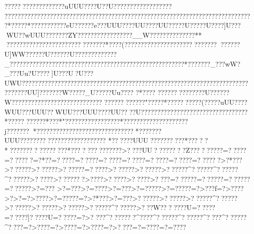 {{{{{{{{{{{{{{{{{{{{{{{{{{{{{{{{{{{{{{{{{{{{{{{{{{{{{{{{{{{{{{{{{{{{{{{{{{{{{{{{{{{{{{{{{{{{{{{{{{{{{{{{{{{{{{{{{{{{{{{{{{{{{{{{{{{{{{{{{{{{{{{{{{{{{{{{{{{{{{{{{{{{{{{{{{{{{{{{{{{{{{{{{{{{{{{{{{{{{{{{{{{{{{{{{{{{{{{{{{{{{{{{{{{{{{{{{{{{{{{{{{{{{{{{{{{{{{{{{{{{{{{{{{{{{{{{{{{{{{{{{{{{{{{{{{{{{{{{{{{{{{{{{{{{{{{{{{{{{{{{{{{{{{{{{{{{{{{{{{{{{{{{{{{{{{{{{{{{{{{{{{{{{{{{{{{{{{{{{{{{{{{{{{{{{{{{{{{{{{{{{{{{{{{{{{{{{{{{{{{{{{{{{{{{{{{{{{{{{{{{{{{{{{{{{{{{{{{{{{{{{{{{{{{{{{{{{{{{{{{{{{{{{{{{{{{{{{{{{{{{{{{{{{{{{{{{{{{{{{{{{{{{{{{{{{{{{{{{{{{{{{{{{{{{{{{{{{{{{{{{{{{{{{{{{{{{{{{{{{{{{{{{{{{{{{{{{{{{{{{{{{{{{{{{{{{{{{{{{{{{{{{{{{{{{{{{{{{{{{{{{{{{{{{{{{{{{{{{{{{{{{{{{{{{{{{{{{{{{{{{{{{{{{{{{{{{{{{{{{{{{{{{{{{{{{{{{{{{{{{{{{{{{{{{{{{{{{{{{{{{{{{{{{{{{{{{{{{{{{{{{{{{{{{{{{{{{{{{{{{{{{{{{{{{{{{{{{{{{{{{{{{{{{{{{{{{{{{{{{{{{{{{{{{{{{{{{{{{{{{{{{{{{{{{{{{{{{{{{{{{{{{{{{{{{{{{{{{{{{{{{{{{{{{{{{{{{{{{{{{{{{{{{{{{{{{{{{{{{{{{{{{{{{{{{{{{{{{{{{{{{{{{{{{{{{{{{{{{{{{{{{{{{{{{{{{{{{{{{{{{{{{{{{{{{{{{{{{{{{{{{{{{{{{{{{{{{{{{{{{{{{{{{{{{{{{{{{{{{{{{{{{{{{{{{{{{{{{{{{{{{{{{{{{{{{{{{{{{{{{{{{{{{{{{{{{{{{{{{{{{{{{{{{{{{{{{{{{{{{{{{{{{{{{{{{{{{{{{{{{{{{{{{{{{{{{{{{{{{{{{{{{{{{{{{{{{{{{{{{{{{{{{{{{{{{{{{{{{{{{{{{{{{{{{{{{{{{{{{{{{{{{{{{{{{{{{{{{{{{{{{{{{{{{{{{{{{{{{{{{{{{{{{{{{{{{{{{{{{{{{{{{{{{{{{{{{{{{{{{{{{{{{{{{{{{{{{{{{{{{{{{{{{{{{{{{{{{{{{{{{{{{{{{{{{{{{{{{{{{{{{{{{{{{{{{{{{{{{{{{{{{{{{{{{{{{{{{{{{{{{{{{{{{{{{{{{{{{{{{{{{{{{{{{{{{{{{{{{{{{{{{{{{{{{{{{{{{{{{{{{{{{{{{{{{{{{{{{{{{{{{{{{{{{{{{{{{{{{{{{{{{{{{{{{{{{{{{{{{{{{{{{{{{{{{{{{{{{{{{{{{{{{{{{{{{{{{{{{{{{{{{{{{{{{{{{{{{{{{{{{{{{{{{{{{{{{{{{{{{{{{{{{{{{{{{{{{{{{{{{{{{{{{{{{{{{{{{{{{{{{{{{{{{{{{{{{{{{{{{{{{{{{{{{{{{{{{{{{{{{{{{{{{{{{{{{{{{{{{{{{{{{{{{{{{{{{{{{{{{{{{{{{{{{{{{{{{{{{{{{{{{{{{{{{{{{{{{{{{{{{{{{{{{{{{{{{{{{{{{{{{{{{{{{{{{{{{{{{????? ?????????????uUUU????U??U??????????????????
?????????????????????????????????????????????????????????????????????????????*????? *????  ???????eU??????e???UUU????UU????UU?????U?????U????]U???WU??wUUU??    ?????ZY?????????????????__W???   ???????????**
??????????????????????????????*????(??????????????????????????????????U]WW??????U??????U?????????????_?????????? ????????????????????????????????????????????*???????_???wW?_???Uu?U????]U???U?U???U}WU?????????????????????????????????????????????????????????????????????????????UU]???????W?????_U?????Uu????
?*????
?????? ????????U??????W????????????????????????????
???????????? "????? *????? ?????  (?????uUU????WUU???UUU??WUU???UUU????UU????U?????????????????????????????????*?????
????? ?*???  *"?????????????????*????????????????????j??????? *????????????? ?????????????????*???????UUU??????????????????????????
*??????UUU??????????*????? 
*????????????????*??????????????>????UU????????Z?????????=?????=??????=?*??=?????=?????=?????=?????=?????=?????=??????>?*???>??????>??????>??????=?????>??????>??????>??????^??????^??????^??????>?????>???????>????>?????>?????>??  ??=??????=??????=??????=??????>?=???
>?=???>?=????>?=???>?=?????>?=?????=?>???f=?>????>?>?    =?>????>?=?????=?>?*???>?=???>??????>??????>??????^??????>??????>??????>??????>??????^??????>???W???????U=?????=?????]?????U=?????=?>?
???^???????^????^??????^??????^????^??????^????=?>????=?>????=?>????=?>????=?=????=?=????}}}}}}}}}}}}}}}}}}}}}}}}}}}}}}}}}}}}}}}}}}}}}}}}}}}}}}}}}}}}}}}}}}}}}}}}}}}}}}}}}}}}}}}}}}}}}}}}}}}}}}}}}}}}}}}}}}}}}}}}}}}}}}}}}}}}}}}}}}}}}}}}}}}}}}}}}}}}}}}}}}}}}}}}}}}}}}}}}}}}}}}}}}}}}}}}}}}}}}}}}}}}}}}}}}}}}}}}}}}}}}}}}}}}}}}}}}}}}}}}}}}}}}}}}}}}}}}}}}}}}}}}}}}}}}}}}}}}}}}}}}}}}}}}}}}}}}}}}}}}}}}}}}}}}}}}}}}}}}}}}}}}}}}}}}}}}}}}}}}}}}}}}}}}}}}}}}}}}}}}}}}}}}}}}}}}}}}}}}}}}}}}}}}}}}}}}}}}}}}}}}}}}}}}}}}}}}}}}}}}}}}}}}}}}}}}}}}}}}}}}}}}}}}}}}}}}}}}}}}}}}}}}}}}}}}}}}}}}}}}}}}}}}}}}}}}}}}}}}}}}}}}}}}}}}}}}}}}}}}}}}}}}}}}}}}}}}}}}}}}}}}}}}}}}}}}}}}}}}}}}}}}}}}}}}}}}}}}}}}}}}}}}}}}}}}}}}}}}}}}}}}}}}}}}}}}}}}}}}}}}}}}}}}}}}}}}}}}}}}}}}}}}}}}}}}}}}}}}}}}}}}}}}}}}}}}}}}}}}}}}}}}}}}}}}}}}}}}}}}}}}}}}}}}}}}}}}}}}}}}}}}}}}}}}}}}}}}}}}}}}}}}}}}}}}}}}}}}}}}}}}}}}}}}}}}}}}}}}}}}}}}}}}}}}}}}}}}}}}}}}}}}}}}}}}}}}}}}}}}}}}}}}}}}}}}}}}}}}}}}}}}}}}}}}}}}}}}}}}}}}}}}}}}}}}}}}}}}}}}}}}}}}}}}}}}}}}}}}}}}}}}}}}}}}}}}}}}}}}}}}}}}}}}}}}}}}}}}}}}}}}}}}}}}}}}}}}}}}}}}}}}}}}}}}}}}}}}}}}}}}}}}}}}}}}}}}}}}}}}}}}}}}}}}}}}}}}}}}}}}}}}}}}}}}}}}}}}}}}}}}}}}}}}}}}}}}}}}}}}}}}}}}}}}}}}}}}}}}}}}}}}}}}}}}}}}}}}}}}}}}}}}}}}}}}}}}}}}}}}}}}}}}}}}}}}}}}}}}}}}}}}}}}}}}}}}}}}}}}}}}}}}}}}}}}}}}}}}}}}}}}}}}}}}}}}}}}}}}}}}}}}}}}}}}}}}}}}}}}}}}}}}}}}}}}}}}}}}}}}}}}}}}}}}}}}}}}}}}}}}}}}}}}}}}}}}}}}}}}}}}}}}}}}}}}}}}}}}}}}}}}}}}}}}}}}}}}}}}}}}}}}}}}}}}}}}}}}}}}}}}}}}}}}}}}}}}}}}}}}}}}}}}}}}}}}}}}}}}}}}}}}}}}}}}}}}}}}}}}}}}}}}}}}}}}}}}}}}}}}}}}}}}}}}}}}}}}}}}}}}}}}}}}}}}}}}}}}}}}}}}}}}}}}}}}}}}}}}}}}}}}}}}}}}}}}}}}}}}}}}}}}}}}}}}}}}}}}}}}}}}}}}}}}}}}}}}}}}}}}}}}}}}}}}}}}}}}}}}}}}}}}}}}}}}}}}}}}}}}}}}}}}}}}}}}}}}}}}}}}}}}}}}}}}}}}}}}}}}}}}}}}}}}}}}}}}}}}}}}}}}}}}}}}}}}}}}}}}}}}}}}}}}}}}}}}}}}}}}}}}}}}}}}}}}}}}}}}}}}}}}}}}}}}}}}}}}}}}}}}}}}}}}}}}}}}}}}}}}}}}}}}}}}}}}}}}}}}}}}}}}}}}}}}}}}}}}}}}}}}}}}}}}}}}}}}}}}}
